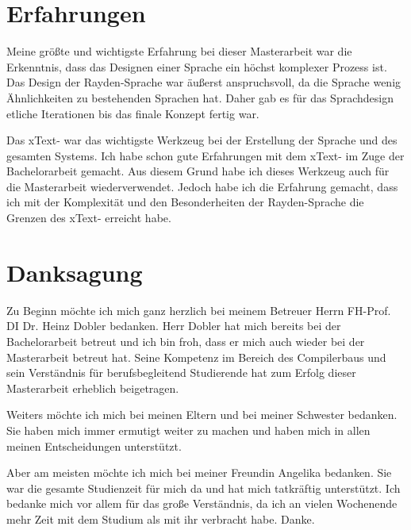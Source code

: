 \section{Erfahrungen}

Meine größte und wichtigste Erfahrung bei dieser Masterarbeit war die Erkenntnis, dass das Designen einer Sprache ein höchst komplexer Prozess ist. Das Design der Rayden-Sprache war äußerst anspruchsvoll, da die Sprache wenig Ähnlichkeiten zu bestehenden Sprachen hat. Daher gab es für das Sprachdesign etliche Iterationen bis das finale Konzept fertig war.

\SuperPar
Das xText- war das wichtigste Werkzeug bei der Erstellung der Sprache und des gesamten Systems. Ich habe schon gute Erfahrungen mit dem xText- im Zuge der Bachelorarbeit gemacht. Aus diesem Grund habe ich dieses Werkzeug auch für die Masterarbeit wiederverwendet. Jedoch habe ich die Erfahrung gemacht, dass ich mit der Komplexität und den Besonderheiten der Rayden-Sprache die Grenzen des xText- erreicht habe.

\section{Danksagung}

Zu Beginn möchte ich mich ganz herzlich bei meinem Betreuer Herrn FH-Prof. DI Dr. Heinz Dobler bedanken. Herr Dobler hat mich bereits bei der Bachelorarbeit betreut und ich bin froh, dass er mich auch wieder bei der Masterarbeit betreut hat. Seine Kompetenz im Bereich des Compilerbaus und sein Verständnis für berufsbegleitend Studierende hat zum Erfolg dieser Masterarbeit erheblich beigetragen. 

\SuperPar
Weiters möchte ich mich bei meinen Eltern und bei meiner Schwester bedanken. Sie haben mich immer ermutigt weiter zu machen und haben mich in allen meinen Entscheidungen unterstützt.

\SuperPar
Aber am meisten möchte ich mich bei meiner Freundin Angelika bedanken. Sie war die gesamte Studienzeit für mich da und hat mich tatkräftig unterstützt. Ich bedanke mich vor allem für das große Verständnis, da ich an vielen Wochenende mehr Zeit mit dem Studium als mit ihr verbracht habe. Danke.
